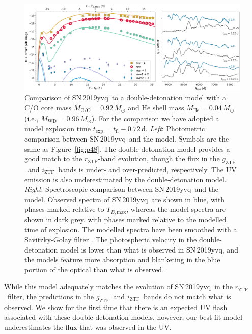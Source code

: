 \documentclass[twocolumn]{aastex63}
\newcommand{\rztf}{$r_\mathrm{ZTF}$}
\newcommand{\gztf}{$g_\mathrm{ZTF}$}
\newcommand{\iztf}{$i_\mathrm{ZTF}$}
\newcommand{\tbmax}{$T_{B,\mathrm{max}}$}
\newcommand{\sn}{SN\,2019yvq}
\begin{document}
\begin{figure}
    \centering
    \includegraphics[width=\textwidth]{./figures/double_det.pdf}
    \caption{Comparison of \sn\ to a double-detonation model with a C/O core
    mass $M_\mathrm{C/O} = 0.92\,M_\odot$ and He shell mass $M_\mathrm{He} =
    0.04\,M_\odot$ (i.e., $M_\mathrm{WD} = 0.96\,M_\odot$). For the comparison
    we have adopted a model explosion time $t_\mathrm{exp} = t_\mathrm{fl} -
    0.72$\,d. \textit{Left}: Photometric comparison between \sn\ and the
    model. Symbols are the same as Figure~\ref{fig:p48}. The double-detonation
    model provides a good match to the \rztf-band evolution, though the flux
    in the \gztf\ and \iztf\ bands is under- and over-predicted, respectively.
    The UV emission is also underestimated by the double-detonation model.
    \textit{Right}: Spectroscopic comparison between \sn\ and the model.
    Observed spectra of \sn\ are shown in blue, with phases marked relative to
    \tbmax, whereas the model spectra are shown in dark grey, with phases
    marked relative to the modelled time of explosion. The modelled spectra
    have been smoothed with a Savitzky-Golay filter \citep{Savitzky64}. The
    photospheric velocity in the double-detonation model is lower than what is
    observed in \sn, and the models feature more absorption and blanketing in
    the blue portion of the optical than what is observed. }
    \label{fig:double_det}
\end{figure}

While this model adequately matches the evolution of \sn\ in the \rztf\
filter, the predictions in the \gztf\ and \iztf\ bands do not match what is
observed. We show for the first time that there is an expected UV flash
associated with these double-detonation models, however, our best fit model
underestimates the flux that was observed in the UV.
\end{document}
